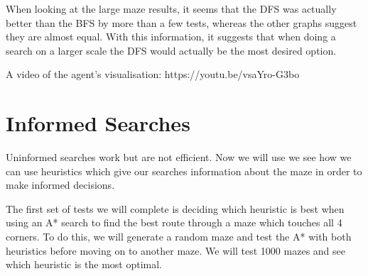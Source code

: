 \documentclass[]{final_report}
\begin{document}
When looking at the large maze results, it seems that the DFS was actually better than the BFS by more than a few tests, whereas the other graphs suggest they are almost equal. With this information, it suggests that when doing a search on a larger scale the DFS would actually be the most desired option.

A video of the agent's visualisation: https://youtu.be/vsaYro-G3bo

\newpage
\section{Informed Searches}\label{Ininformed search implementation}

Uninformed searches work but are not efficient. Now we will use we see how we can use heuristics which give our searches information about the maze in order to make informed decisions. 

The first set of tests we will complete is deciding which heuristic is best when using an A* search to find the best route through a maze which touches all 4 corners. To do this, we will generate a random maze and test the A* with both heuristics before moving on to another maze. We will test 1000 mazes and see which heuristic is the most optimal.
\end{document}
